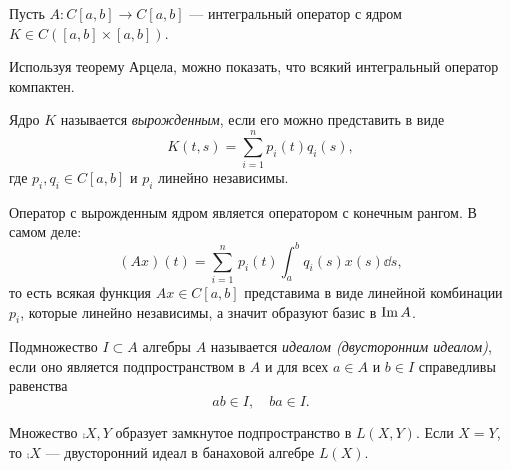 \begin{example}
    Пусть $A \colon C[a, b] \to C[a, b]$ --- интегральный оператор с ядром 
    $K \in C([a,b] \times [a,b])$.

    Используя теорему Арцела, можно показать, что всякий интегральный оператор компактен.

    Ядро $K$ называется \emph{вырожденным}, если его можно представить в виде
    \[ K(t, s) = \sum_{i=1}^n p_i(t) q_i(s), \]
    где $p_i, q_i \in C[a, b]$ и $p_i$ линейно независимы.

    Оператор с вырожденным ядром является оператором с конечным рангом. В самом деле:
    \[ (Ax)(t) = \sum_{i=1}^n \, p_i(t) \!\! \int_a^b \! q_i(s) x(s) \dd s, \]
    то есть всякая функция $Ax \in C[a,b]$ представима в виде линейной комбинации 
    $p_i$, которые линейно независимы, а значит образуют базис в $\operatorname{Im} A$.
\end{example}

\begin{definition}
    Подмножество $I \subset A$ алгебры $A$ называется \emph{идеалом (двусторонним идеалом)}, если
    оно является подпространством в $A$ и для всех $a \in A$ и $b \in I$ справедливы равенства
    \[ ab \in I, \quad ba \in I. \]
\end{definition}

\begin{theorem}
    Множество $\comp{X,Y}$ образует замкнутое подпространство в $L(X, Y)$. Если $X = Y$,
    то $\comp{X}$ --- двусторонний идеал в банаховой алгебре $L(X)$.
\end{theorem}

